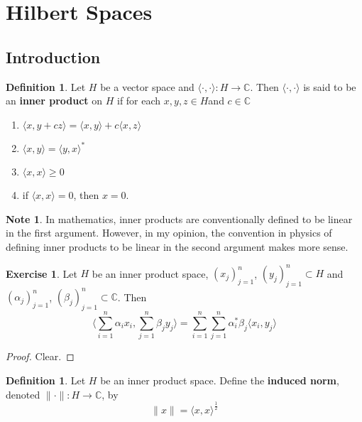\documentclass[12pt]{amsart}
\theoremstyle{definition}
\newtheorem{defn}[definition]{Definition}
\newtheorem{note}[definition]{Note}
\newtheorem{ex}[definition]{Exercise}
\newcommand{\al}{\alpha}
\newcommand{\be}{\beta}
\newcommand{\C}{\mathbb{C}}
\renewcommand{\r}{\rangle}
\renewcommand{\l}{\langle}
\newcommand{\lex}[1]{\label{ex:#1}}
\newcommand{\ld}[1]{\label{defn:#1}}
\begin{document}
	
	
	
	
	
	
	
	
	
	
	\newpage
	\section{Hilbert Spaces}
	
	\subsection{Introduction}
	
	\begin{defn} \ld{}
		Let $H$ be a vector space and $\l \cdot, \cdot \r: H \rightarrow \C$. Then $\l \cdot, \cdot \r$ is said to be an \textbf{inner product} on $H$ if for each $x,y,z \in H$and $c \in \C$
		\begin{enumerate}
			\item $\l x , y + cz\r = \l x , y \r + c\l x , z\r $
			\item $\l x , y \r = \l y , x\r^*$
			\item $\l x , x \r \geq 0$
			\item if $\l x ,x \r = 0$, then $x = 0$.  
		\end{enumerate}
	\end{defn}
	
	\begin{note}
	In mathematics, inner products are conventionally defined to be linear in the first argument. However, in my opinion, the convention in physics of defining inner products to be linear in the second argument makes more sense.
	\end{note}
	 
	\begin{ex} \lex{}
	Let $H$ be an inner product space, $(x_j)_{j =1}^n$, $(y_j)_{j =1}^n \subset H$ and $(\al_j)_{j=1}^n$, $(\be_j)_{j=1}^n \subset \C$. Then $$\bigg \l \sum_{i=1}^n \al_i x_i , \sum_{j=1}^n \be_j y_j \bigg \r = \sum_{i=1}^n \sum_{j=1}^n \al_i^*\be_j \l x_i , y_j \r $$
\end{ex}

\begin{proof}
Clear.
\end{proof}

\begin{defn} \ld{}
Let $H$ be an inner product space. Define the \textbf{induced norm}, denoted $\|\cdot \|: H \rightarrow \C$, by $$\|x\| = \l x, x\r^{\frac{1}{2}}$$
\end{defn}
\end{document}
